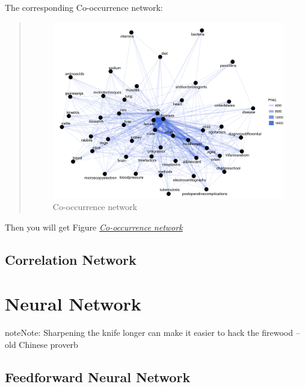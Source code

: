 \documentclass[letterpaper,11pt,english]{sphinxmanual}
\begin{document}
The corresponding Co-occurrence network:
\begin{quote}
\begin{figure}[htbp]
\centering
\capstart

\includegraphics{netfreq.png}
\caption{Co-occurrence network}\label{socialnetwork:fig-netfreq}\end{figure}
\end{quote}

Then you will get Figure {\hyperref[socialnetwork:fig-netfreq]{\emph{Co-occurrence network}}}


\section{Correlation Network}
\label{socialnetwork:correlation-network}

\chapter{Neural Network}
\label{fnn:fnn}\label{fnn:co-occurrence-networks}\label{fnn::doc}\label{fnn:neural-network}
\begin{notice}{note}{Note:}
Sharpening the knife longer can make it easier to hack the firewood -- old Chinese proverb
\end{notice}


\section{Feedforward Neural Network}
\label{fnn:feedforward-neural-network}
\end{document}
